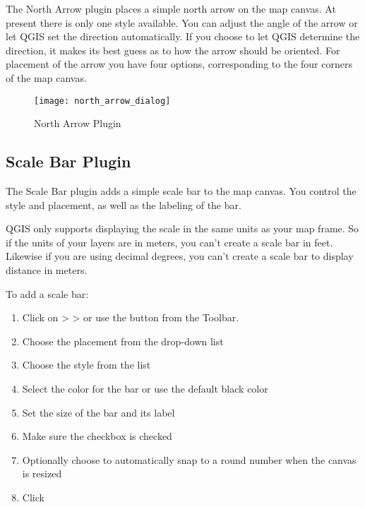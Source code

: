 The North Arrow plugin places a simple north arrow on the map canvas. At
present there is only one style available. You can adjust the angle of the
arrow or let QGIS set the direction automatically. If you choose to let
QGIS determine the direction, it makes its best guess as to how the arrow
should be oriented. For placement of the arrow you have four options, 
corresponding to the four corners of the map canvas.

\begin{figure}[ht]
   \centering
   \texttt{[image: north\_arrow\_dialog]}   
   \caption{North Arrow Plugin \nixcaption}\label{fig:north_arrow}
\end{figure}

\subsection{Scale Bar Plugin}
The Scale Bar plugin adds a simple scale bar to the map canvas. You
control the style and placement, as well as the labeling of the bar. 

QGIS only supports displaying the scale in the same units as your map frame. So
if the units of your layers are in meters, you can't create a scale bar in
feet. Likewise if you are using decimal degrees, you can't create a scale
bar to display distance in meters.

To add a scale bar:

\begin{enumerate}
\item Click on  >  >  or use the  button from the Toolbar.
\item Choose the placement from the  drop-down list
\item Choose the style from the  list
\item Select the color for the bar  or use the default black color
\item Set the size of the bar and its label 
\item Make sure the  checkbox is checked
\item Optionally choose to automatically snap to a round number when the
  canvas is resized 
\item Click  
\end{enumerate} 

